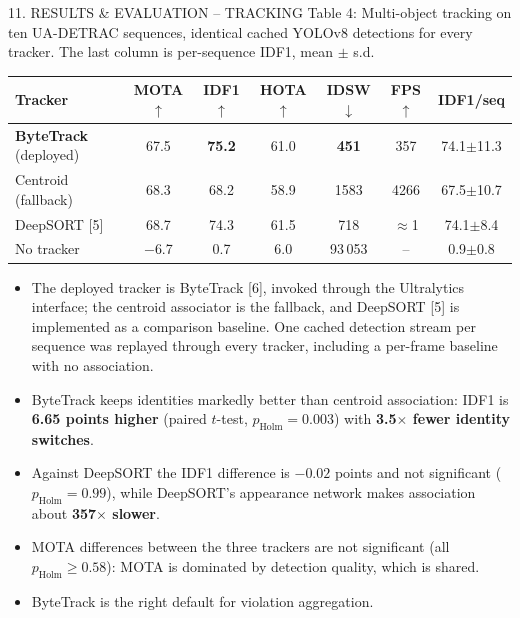 \documentclass[aspectratio=169,10pt,t]{beamer}
\begin{document}
\begin{frame}{11. RESULTS \& EVALUATION -- TRACKING}
\scriptsize
\centering
{\tiny Table 4: Multi-object tracking on ten UA-DETRAC sequences, identical cached YOLOv8 detections for every tracker.
The last column is per-sequence IDF1, mean $\pm$ s.d.}\\[0.2em]
\setlength{\tabcolsep}{4pt}
\begin{tabular}{@{}lcccccc@{}}
\toprule
\textbf{Tracker} & \textbf{MOTA}$\uparrow$ & \textbf{IDF1}$\uparrow$ & \textbf{HOTA}$\uparrow$ & \textbf{IDSW}$\downarrow$ & \textbf{FPS}$\uparrow$ & \textbf{IDF1/seq}\\
\midrule
\textbf{ByteTrack} (deployed) & 67.5 & \textbf{75.2} & 61.0 & \textbf{451} & 357 & 74.1$\pm$11.3\\
Centroid (fallback) & 68.3 & 68.2 & 58.9 & 1583 & 4266 & 67.5$\pm$10.7\\
DeepSORT [5] & 68.7 & 74.3 & 61.5 & 718 & $\approx$1 & 74.1$\pm$8.4\\
No tracker & $-$6.7 & 0.7 & 6.0 & 93\,053 & -- & 0.9$\pm$0.8\\
\bottomrule
\end{tabular}
\vspace{0.6em}
\raggedright
\begin{itemize}\setlength{\itemsep}{0.2em}
  \item The deployed tracker is ByteTrack [6], invoked through the Ultralytics interface; the centroid associator is the
        fallback, and DeepSORT [5] is implemented as a comparison baseline. One cached detection stream per sequence was
        replayed through every tracker, including a per-frame baseline with no association.
  \item ByteTrack keeps identities markedly better than centroid association: IDF1 is \textbf{6.65 points higher}
        (paired $t$-test, $p_\mathrm{Holm}=0.003$) with \textbf{3.5$\times$ fewer identity switches}.
  \item Against DeepSORT the IDF1 difference is $-0.02$ points and not significant ($p_\mathrm{Holm}=0.99$), while
        DeepSORT's appearance network makes association about \textbf{357$\times$ slower}.
  \item MOTA differences between the three trackers are not significant (all $p_\mathrm{Holm}\geq0.58$): MOTA is
        dominated by detection quality, which is shared.
  \item ByteTrack is the right default for violation aggregation.
\end{itemize}
\end{frame}
\end{document}
